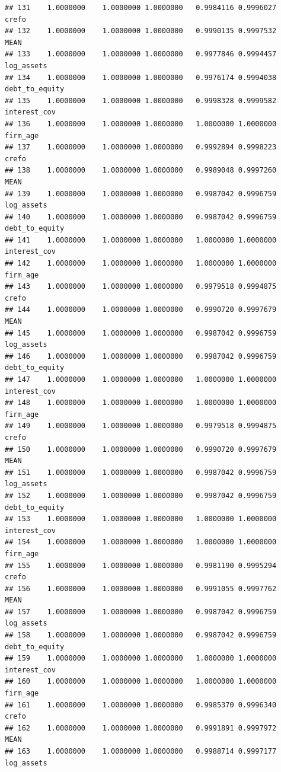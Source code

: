 \documentclass[
]{article}
\begin{document}
\begin{verbatim}
## 131    1.0000000    1.0000000 1.0000000   0.9984116 0.9996027          crefo
## 132    1.0000000    1.0000000 1.0000000   0.9990135 0.9997532           MEAN
## 133    1.0000000    1.0000000 1.0000000   0.9977846 0.9994457     log_assets
## 134    1.0000000    1.0000000 1.0000000   0.9976174 0.9994038 debt_to_equity
## 135    1.0000000    1.0000000 1.0000000   0.9998328 0.9999582   interest_cov
## 136    1.0000000    1.0000000 1.0000000   1.0000000 1.0000000       firm_age
## 137    1.0000000    1.0000000 1.0000000   0.9992894 0.9998223          crefo
## 138    1.0000000    1.0000000 1.0000000   0.9989048 0.9997260           MEAN
## 139    1.0000000    1.0000000 1.0000000   0.9987042 0.9996759     log_assets
## 140    1.0000000    1.0000000 1.0000000   0.9987042 0.9996759 debt_to_equity
## 141    1.0000000    1.0000000 1.0000000   1.0000000 1.0000000   interest_cov
## 142    1.0000000    1.0000000 1.0000000   1.0000000 1.0000000       firm_age
## 143    1.0000000    1.0000000 1.0000000   0.9979518 0.9994875          crefo
## 144    1.0000000    1.0000000 1.0000000   0.9990720 0.9997679           MEAN
## 145    1.0000000    1.0000000 1.0000000   0.9987042 0.9996759     log_assets
## 146    1.0000000    1.0000000 1.0000000   0.9987042 0.9996759 debt_to_equity
## 147    1.0000000    1.0000000 1.0000000   1.0000000 1.0000000   interest_cov
## 148    1.0000000    1.0000000 1.0000000   1.0000000 1.0000000       firm_age
## 149    1.0000000    1.0000000 1.0000000   0.9979518 0.9994875          crefo
## 150    1.0000000    1.0000000 1.0000000   0.9990720 0.9997679           MEAN
## 151    1.0000000    1.0000000 1.0000000   0.9987042 0.9996759     log_assets
## 152    1.0000000    1.0000000 1.0000000   0.9987042 0.9996759 debt_to_equity
## 153    1.0000000    1.0000000 1.0000000   1.0000000 1.0000000   interest_cov
## 154    1.0000000    1.0000000 1.0000000   1.0000000 1.0000000       firm_age
## 155    1.0000000    1.0000000 1.0000000   0.9981190 0.9995294          crefo
## 156    1.0000000    1.0000000 1.0000000   0.9991055 0.9997762           MEAN
## 157    1.0000000    1.0000000 1.0000000   0.9987042 0.9996759     log_assets
## 158    1.0000000    1.0000000 1.0000000   0.9987042 0.9996759 debt_to_equity
## 159    1.0000000    1.0000000 1.0000000   1.0000000 1.0000000   interest_cov
## 160    1.0000000    1.0000000 1.0000000   1.0000000 1.0000000       firm_age
## 161    1.0000000    1.0000000 1.0000000   0.9985370 0.9996340          crefo
## 162    1.0000000    1.0000000 1.0000000   0.9991891 0.9997972           MEAN
## 163    1.0000000    1.0000000 1.0000000   0.9988714 0.9997177     log_assets

\end{verbatim}
\end{document}
